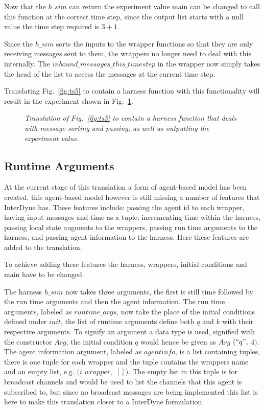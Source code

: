 \documentclass{article}
\begin{document}
Now that the $h\_sim$ can return the experiment value main can be changed to call this function at the correct time step, since the output list starts with a null value the time step required is $3+1$. 

Since the $h\_sim$ sorts the inputs to the wrapper functions so that they are only receiving messages sent to them, the wrappers no longer need to deal with this internally. The $inbound\_messages\_this\_timestep$ in the wrapper now simply takes the head of the list to access the messages at the current time step. 

Translating Fig.~\ref{fig:ts5} to contain a harness function with this functionality will result in the experiment shown in Fig.~\ref{fig:ts6}.
\begin{figure}[H]
	\centering
	
	\caption{\it Translation of Fig.~\ref{fig:ts5} to contain a harness function that deals with message sorting and passing, as well as outputting the experiment value.}
	\label{fig:ts6}
\end{figure} 

\subsection{Runtime Arguments}
At the current stage of this translation a form of agent-based model has been created, this agent-based model however is still missing a number of features that InterDyne has. These features include: passing the agent id to each wrapper, having input messages and time as a tuple, incrementing time within the harness, passing local state augments to the wrappers, passing run time arguments to the harness, and passing agent information to the harness. Here these features are added to the translation. 

To achieve adding these features the harness, wrappers, initial conditions and main have to be changed. 

 The harness $h\_sim$ now takes three arguments, the first is still time followed by the run time arguments and then the agent information. The run time arguments, labeled as $runtime\_args$, now take the place of the initial conditions defined under $init$, the list of runtime arguments define both $q$ and $k$ with their respective arguments. To signify an argument a data type is used, signified with the constructor $Arg$, the initial condition $q$ would hence be given as $Arg$ $(``q",$ $4)$. The agent information argument, labeled as $agentinfo$, is a list containing tuples, there is one tuple for each wrapper and the tuple contains the wrappers name and an empty list, e.g. $(i\_wrapper,$ $[])$. The empty list in this tuple is for broadcast channels and would be used to list the channels that this agent is subscribed to, but since no broadcast messages are being implemented this list is here to make this translation closer to a InterDyne formulation.
\end{document}
